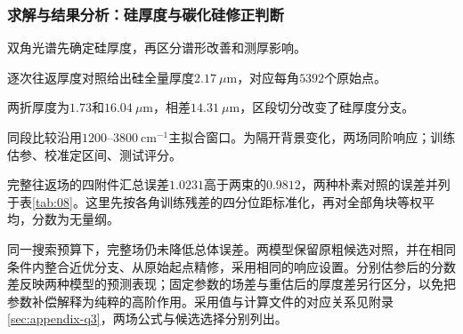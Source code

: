 \subsubsection{求解与结果分析：硅厚度与碳化硅修正判断}

\begingroup
\renewcommand{\baselinestretch}{1.10}\selectfont

双角光谱先确定硅厚度，再区分谱形改善和测厚影响。

逐次往返厚度对照给出硅全量厚度$2.17\ \mu\mathrm{m}$，对应每角$5392$个原始点。

两折厚度为$1.73$和$16.04\ \mu\mathrm{m}$，相差$14.31\ \mu\mathrm{m}$，区段切分改变了硅厚度分支。

同段比较沿用$1200$--$3800\ \mathrm{cm}^{-1}$主拟合窗口。为隔开背景变化，两场同阶响应；训练估参、校准定区间、测试评分。

完整往返场的四附件汇总误差$1.0231$高于两束的$0.9812$，两种朴素对照的误差并列于表\ref{tab:08}。这里先按各角训练残差的四分位距标准化，再对全部角块等权平均，分数为无量纲。

同一搜索预算下，完整场仍未降低总体误差。两模型保留原粗候选对照，并在相同条件内整合近优分支、从原始起点精修，采用相同的响应设置。分别估参后的分数差反映两种模型的预测表现；固定参数的场差与重估后的厚度差另行区分，以免把参数补偿解释为纯粹的高阶作用。采用值与计算文件的对应关系见附录\ref{sec:appendix-q3}，两场公式与候选选择分别列出。

